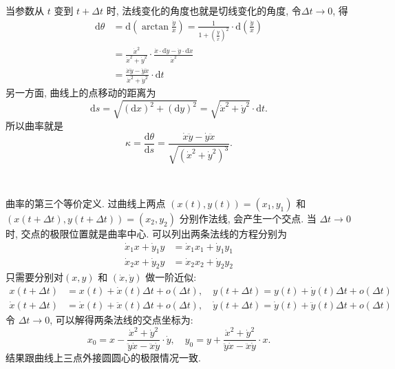 当参数从 $t$ 变到 $t+\Delta t$ 时, 法线变化的角度也就是切线变化的角度, 令$\Delta t\to 0$, 得
\begin{align*}
\mathrm{d}\theta &= \mathrm{d}\left(\arctan\frac{\dot{y}}{\dot{x}}\right) = \frac{1}{1+(\frac{\dot{y}}{\dot{x}})^2}\cdot\mathrm{d}\left(\frac{\dot{y}}{\dot{x}}\right)\\
&= \frac{\dot{x}^2}{\dot{x}^2+\dot{y}^2}\cdot\frac{\dot{x}\cdot\mathrm{d}\dot{y} - \dot{y}\cdot\mathrm{d}\dot{x}}{\dot{x}^2}\\
&= \frac{\dot{x}\ddot{y}-\dot{y}\ddot{x}}{\dot{x}^2+\dot{y}^2}\cdot\mathrm{d}t
\end{align*}
另一方面, 曲线上的点移动的距离为 
\[ \mathrm{d}s = \sqrt{(\mathrm{d}x)^2 + (\mathrm{d}y)^2} = \sqrt{\dot{x}^2+\dot{y}^2}\cdot\mathrm{d}t .\]
所以曲率就是
\[\kappa = \frac{\mathrm{d}\theta}{\mathrm{d}s} = \frac{\dot{x}\ddot{y}-\dot{y}\ddot{x}}{\sqrt{(\dot{x}^2+\dot{y}^2)^3}} .\]

~

曲率的第三个等价定义. 过曲线上两点 $(x(t),y(t)) = (x_1,y_1)$ 和 $(x(t+\Delta t), y(t+\Delta t)) = (x_2,y_2)$ 分别作法线, 会产生一个交点. 当 $\Delta t\to 0$ 时, 交点的极限位置就是曲率中心. 可以列出两条法线的方程分别为
\begin{align*}
\dot{x}_1 x + \dot{y}_1 y &= \dot{x}_1 x_1 + \dot{y}_1 y_1 \\
\dot{x}_2 x + \dot{y}_2 y &= \dot{x}_2 x_2 + \dot{y}_2 y_2 
\end{align*}
只需要分别对$(x,y)$ 和 $(\dot{x},\dot{y})$ 做一阶近似:
\begin{align*}
x(t+\Delta t) &= x(t) + \dot{x}(t)\Delta t + o(\Delta t), \quad y(t+\Delta t) = y(t) + \dot{y}(t)\Delta t + o(\Delta t)\\
\dot{x}(t+\Delta t) &= \dot{x}(t) + \ddot{x}(t)\Delta t + o(\Delta t), \quad \dot{y}(t+\Delta t) = \dot{y}(t) + \ddot{y}(t)\Delta t + o(\Delta t)
\end{align*}
令 $\Delta t \to 0$, 可以解得两条法线的交点坐标为:
\[ x_0 = x - \frac{\dot{x}^2+\dot{y}^2}{\ddot{y}\dot{x}-\ddot{x}\dot{y}}\cdot\dot{y}, \quad y_0 = y + \frac{\dot{x}^2+\dot{y}^2}{\ddot{y}\dot{x}-\ddot{x}\dot{y}}\cdot{x} .\]
结果跟曲线上三点外接圆圆心的极限情况一致.

~

